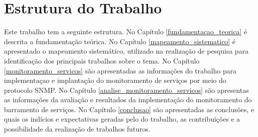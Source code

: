 
\section{Estrutura do Trabalho}

Este trabalho tem a seguinte estrutura. No Capítulo \ref{fundamentacao_teorica} é descrita a fundamentação teórica. No Capítulo \ref{mapeamento_sistematico} é apresentado o mapeamento sistemático, utilizado na realização de pesquisa para identificação dos principais trabalhos sobre o tema. No Capítulo \ref{monitoramento_servicos} são apresentadas as informações do trabalho para implementaçao e implantação do monitoramento de serviços por meio do protocolo \acrshort{SNMP}. No Capítulo \ref{analise_monitoramento_servicos} são apresentas as informações da avaliação e resultados da implementação do monitoramento do barramento de serviços. No Capítulo \ref{conclusao} são apresentadas as conclusões, e quais os indícios e expectativas geradas pelo do trabalho, as contribuições e a possibilidade da realização de trabalhos futuros.